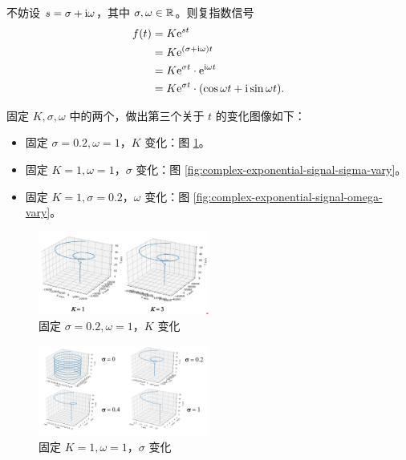 \begin{property}[复指数信号与正余弦信号之间的关系]
    不妨设 $s = \sigma + \mathrm{i}\omega$，其中 $\sigma, \omega \in \mathbb{R}$。则复指数信号
    \begin{align*}
        f(t) & = K\mathrm{e}^{st} \\
        & = K\mathrm{e}^{(\sigma + \mathrm{i}\omega)t} \\
        & = K\mathrm{e}^{\sigma t} \cdot \mathrm{e}^{\mathrm{i} \omega t} \\
        & = K\mathrm{e}^{\sigma t} \cdot (\cos \omega t + \mathrm{i} \sin \omega t).
    \end{align*}

    固定 $K, \sigma, \omega$ 中的两个，做出第三个关于 $t$ 的变化图像如下：
    \begin{itemize}
        \item 固定 $\sigma = 0.2, \omega = 1$，$K$ 变化：图 \ref{fig:complex-exponential-signal-k-vary}。
        \item 固定 $K = 1, \omega = 1$，$\sigma$ 变化：图 \ref{fig:complex-exponential-signal-sigma-vary}。
        \item 固定 $K = 1, \sigma = 0.2$，$\omega$ 变化：图 \ref{fig:complex-exponential-signal-omega-vary}。
    \end{itemize}
    \begin{figure}[H]
        \centering
        \includegraphics[width=0.5\textwidth]{chap1/img/complex-exponential-signal-k-vary.png}
        \caption{固定 $\sigma = 0.2, \omega = 1$，$K$ 变化}
        \label{fig:complex-exponential-signal-k-vary}
    \end{figure}
    \begin{figure}[H]
        \centering
        \includegraphics[width=0.5\textwidth]{chap1/img/complex-exponential-signal-sigma-vary.png}
        \caption{固定 $K = 1, \omega = 1$，$\sigma$ 变化}

\end{figure}
\end{property}
